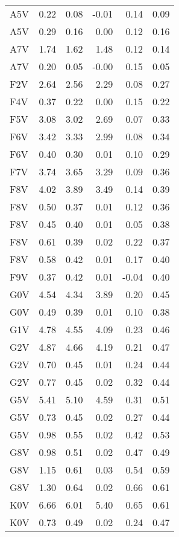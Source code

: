 \begin{tabular}{lrrrrr}
 A5V &  0.22 &  0.08 & -0.01 &  0.14 &  0.09 \\
 A5V &  0.29 &  0.16 &  0.00 &  0.12 &  0.16 \\
 A7V &  1.74 &  1.62 &  1.48 &  0.12 &  0.14 \\
 A7V &  0.20 &  0.05 & -0.00 &  0.15 &  0.05 \\
 F2V &  2.64 &  2.56 &  2.29 &  0.08 &  0.27 \\
 F4V &  0.37 &  0.22 &  0.00 &  0.15 &  0.22 \\
 F5V &  3.08 &  3.02 &  2.69 &  0.07 &  0.33 \\
 F6V &  3.42 &  3.33 &  2.99 &  0.08 &  0.34 \\
 F6V &  0.40 &  0.30 &  0.01 &  0.10 &  0.29 \\
 F7V &  3.74 &  3.65 &  3.29 &  0.09 &  0.36 \\
 F8V &  4.02 &  3.89 &  3.49 &  0.14 &  0.39 \\
 F8V &  0.50 &  0.37 &  0.01 &  0.12 &  0.36 \\
 F8V &  0.45 &  0.40 &  0.01 &  0.05 &  0.38 \\
 F8V &  0.61 &  0.39 &  0.02 &  0.22 &  0.37 \\
 F8V &  0.58 &  0.42 &  0.01 &  0.17 &  0.40 \\
 F9V &  0.37 &  0.42 &  0.01 & -0.04 &  0.40 \\
 G0V &  4.54 &  4.34 &  3.89 &  0.20 &  0.45 \\
 G0V &  0.49 &  0.39 &  0.01 &  0.10 &  0.38 \\
 G1V &  4.78 &  4.55 &  4.09 &  0.23 &  0.46 \\
 G2V &  4.87 &  4.66 &  4.19 &  0.21 &  0.47 \\
 G2V &  0.70 &  0.45 &  0.01 &  0.24 &  0.44 \\
 G2V &  0.77 &  0.45 &  0.02 &  0.32 &  0.44 \\
 G5V &  5.41 &  5.10 &  4.59 &  0.31 &  0.51 \\
 G5V &  0.73 &  0.45 &  0.02 &  0.27 &  0.44 \\
 G5V &  0.98 &  0.55 &  0.02 &  0.42 &  0.53 \\
 G8V &  0.98 &  0.51 &  0.02 &  0.47 &  0.49 \\
 G8V &  1.15 &  0.61 &  0.03 &  0.54 &  0.59 \\
 G8V &  1.30 &  0.64 &  0.02 &  0.66 &  0.61 \\
 K0V &  6.66 &  6.01 &  5.40 &  0.65 &  0.61 \\
 K0V &  0.73 &  0.49 &  0.02 &  0.24 &  0.47 \\

\end{tabular}
